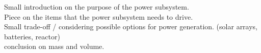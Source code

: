 Small introduction on the purpose of the power subsystem.\\

Piece on the items that the power subsystem needs to drive.\\

Small trade-off / considering possible options for power generation. (solar arrays, batteries, reactor)\\

conclusion on mass and volume.\\



